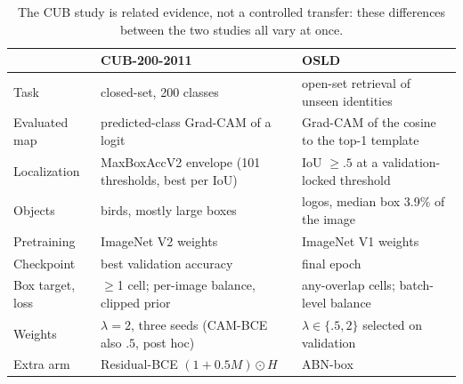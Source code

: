 \begin{table}[t]
\centering\footnotesize\setlength{\tabcolsep}{3pt}
\caption{The CUB study is related evidence, not a controlled transfer: these
differences between the two studies all vary at once.}
\label{tab:cub-osld}
\begin{tabular}{@{}p{}p{}p{}@{}}
\toprule
 & CUB-200-2011 & OSLD \\
\midrule
Task & closed-set, 200 classes & open-set retrieval of unseen identities \\
Evaluated map & predicted-class Grad-CAM of a logit & Grad-CAM of the cosine to the top-1 template \\
Localization & MaxBoxAccV2 envelope (101 thresholds, best per IoU) & IoU $\ge.5$ at a validation-locked threshold \\
Objects & birds, mostly large boxes & logos, median box 3.9\% of the image \\
Pretraining & ImageNet V2 weights & ImageNet V1 weights \\
Checkpoint & best validation accuracy & final epoch \\
Box target, loss & $\ge$1 cell; per-image balance, clipped prior & any-overlap cells; batch-level balance \\
Weights & $\lambda=2$, three seeds (CAM-BCE also $.5$, post hoc) & $\lambda\in\{.5,2\}$ selected on validation \\
Extra arm & Residual-BCE $(1+0.5M)\odot H$ & ABN-box \\
\bottomrule
\end{tabular}
\end{table}

